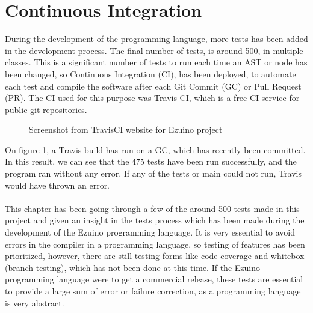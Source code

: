 \section{Continuous Integration}
During the development of the programming language, more tests has been added in the development process. The final number of tests, is around 500, in multiple classes. This is a significant number of tests to run each time an AST or node has been changed, so Continuous Integration (CI), has been deployed, to automate each test and compile the software after each Git Commit (GC) or Pull Request (PR).  The CI used for this purpose was Travis CI, which is a free CI service for public git repositories. \\
\begin{figure}[H]
\centering
{}
\caption{Screenshot from TravisCI website for Ezuino project}
\label{testa}
\end{figure}
On figure \ref{testa}, a Travis build has run on a GC, which has recently been committed. In this result, we can see that the 475 tests have been run successfully, and the program ran without any error. If any of the tests or main could not run, Travis would have thrown an error. \\
\\
This chapter has been going through a few of the around 500 tests made in this project and given an insight in the tests process which has been made during the development of the Ezuino programming language. It is very essential to avoid errors in the compiler in a programming language, so testing of features has been prioritized, however, there are still testing forms like code coverage and whitebox (branch testing), which has not been done at this time. If the Ezuino programming language were to get a commercial release, these tests are essential to provide a large sum of error or failure correction, as a programming language is very abstract.

